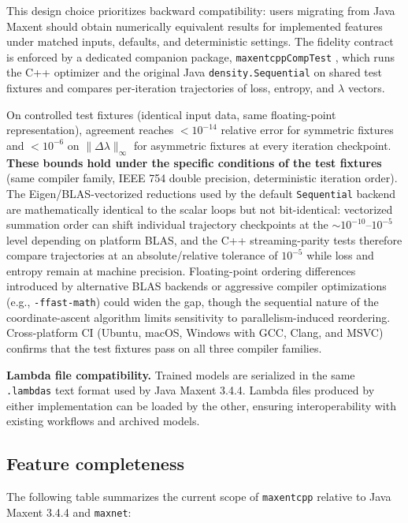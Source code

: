 \documentclass[10pt,letterpaper]{article}
\begin{document}
This design choice prioritizes backward compatibility: users migrating
from Java Maxent should obtain numerically equivalent results for
implemented features under matched inputs, defaults, and deterministic
settings. The fidelity contract is enforced by a dedicated companion
package, \texttt{maxentcppCompTest} \cite{maxentcppCompTest2025}, which
runs the C++ optimizer and the original Java \texttt{density.Sequential}
on shared test fixtures and compares per-iteration trajectories of loss,
entropy, and \(\lambda\) vectors.

On controlled test fixtures (identical input data, same floating-point
representation), agreement reaches \(< 10^{-14}\) relative error for
symmetric fixtures and \(< 10^{-6}\) on \(\|\Delta\lambda\|_\infty\) for
asymmetric fixtures at every iteration checkpoint. \textbf{These bounds
hold under the specific conditions of the test fixtures} (same compiler
family, IEEE 754 double precision, deterministic iteration order).
The Eigen/BLAS-vectorized reductions used by the default
\texttt{Sequential} backend are mathematically identical to the scalar
loops but not bit-identical: vectorized summation order can shift
individual trajectory checkpoints at the \(\sim 10^{-10}\)--\(10^{-5}\)
level depending on platform BLAS, and the C++ streaming-parity tests
therefore compare trajectories at an absolute/relative tolerance of
\(10^{-5}\) while loss and entropy remain at machine precision.
Floating-point ordering differences introduced by alternative BLAS
backends or aggressive compiler optimizations (e.g.,
\texttt{-ffast-math}) could widen the gap, though the sequential nature
of the coordinate-ascent algorithm limits sensitivity to
parallelism-induced reordering. Cross-platform CI (Ubuntu, macOS,
Windows with GCC, Clang, and MSVC) confirms that the test fixtures pass
on all three compiler families.

\textbf{Lambda file compatibility.} Trained models are serialized in the
same \texttt{.lambdas} text format used by Java Maxent 3.4.4. Lambda
files produced by either implementation can be loaded by the other,
ensuring interoperability with existing workflows and archived models.

\subsection*{Feature completeness}

The following table summarizes the current scope of \texttt{maxentcpp}
relative to Java Maxent 3.4.4 and \texttt{maxnet}:
\end{document}
